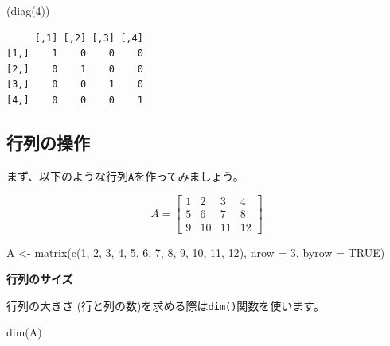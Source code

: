 \documentclass[
  a4paper,
  pandoc,
  ja=standard,
  jafont=haranoaji]{bxjsbook}
\newenvironment{Shaded}{\begin{snugshade}}{\end{snugshade}}
\newcommand{\AttributeTok}[1]{\textcolor[rgb]{0.00,0.48,0.65}{#1}}
\newcommand{\ConstantTok}[1]{\textcolor[rgb]{0.56,0.35,0.01}{#1}}
\newcommand{\DecValTok}[1]{\textcolor[rgb]{0.68,0.00,0.00}{#1}}
\newcommand{\FunctionTok}[1]{\textcolor[rgb]{0.28,0.35,0.67}{#1}}
\newcommand{\NormalTok}[1]{\textcolor[rgb]{0.00,0.48,0.65}{#1}}
\newcommand{\OtherTok}[1]{\textcolor[rgb]{0.00,0.48,0.65}{#1}}
\begin{document}
\begin{Shaded}
\begin{Highlighting}[numbers=left,,]
\NormalTok{(}\FunctionTok{diag}\NormalTok{(}\DecValTok{4}\NormalTok{))}
\end{Highlighting}
\end{Shaded}

\begin{verbatim}
     [,1] [,2] [,3] [,4]
[1,]    1    0    0    0
[2,]    0    1    0    0
[3,]    0    0    1    0
[4,]    0    0    0    1
\end{verbatim}

\hypertarget{ux884cux5217ux306eux64cdux4f5c}{%
\subsection{行列の操作}\label{ux884cux5217ux306eux64cdux4f5c}}

まず、以下のような行列\texttt{A}を作ってみましょう。

\[
A = \left[
\begin{matrix} 
1 & 2 & 3 & 4 \\ 
5 & 6 & 7 & 8 \\
9 & 10 & 11 & 12
\end{matrix}
\right]
\]

\begin{Shaded}
\begin{Highlighting}[numbers=left,,]
\NormalTok{A }\OtherTok{\textless{}{-}} \FunctionTok{matrix}\NormalTok{(}\FunctionTok{c}\NormalTok{(}\DecValTok{1}\NormalTok{, }\DecValTok{2}\NormalTok{, }\DecValTok{3}\NormalTok{, }\DecValTok{4}\NormalTok{, }\DecValTok{5}\NormalTok{, }\DecValTok{6}\NormalTok{, }\DecValTok{7}\NormalTok{, }\DecValTok{8}\NormalTok{, }\DecValTok{9}\NormalTok{, }\DecValTok{10}\NormalTok{, }\DecValTok{11}\NormalTok{, }\DecValTok{12}\NormalTok{), }
            \AttributeTok{nrow =} \DecValTok{3}\NormalTok{, }\AttributeTok{byrow =} \ConstantTok{TRUE}\NormalTok{)}
\end{Highlighting}
\end{Shaded}

\textbf{行列のサイズ}

行列の大きさ (行と列の数)を求める際は\texttt{dim()}関数を使います。

\begin{Shaded}
\begin{Highlighting}[numbers=left,,]
\FunctionTok{dim}\NormalTok{(A)}
\end{Highlighting}
\end{Shaded}
\end{document}
